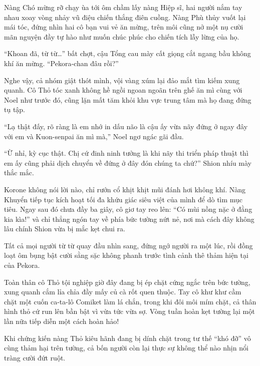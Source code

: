\documentclass[../main.tex]{subfiles}
\begin{document}

Nàng Chó mừng rỡ chạy ùa tới ôm chầm lấy nàng Hiệp sĩ, hai người nắm tay nhau xoay vòng nhảy vũ điệu chiến thắng điên cuồng. Nàng Phù thủy vuốt lại mái tóc, đứng nhìn hai cô bạn vui vẻ ăn mừng, trên môi cũng nở một nụ cười mãn nguyện đầy tự hào như muốn chúc phúc cho chiến tích lẫy lừng của họ.

``Khoan đã, từ từ\dots'' bất chợt, cậu Tổng cau mày cất giọng cắt ngang bầu không khí ăn mừng. ``Pekora-chan đâu rồi?''

Nghe vậy, cả nhóm giật thót mình, vội vàng xúm lại đảo mắt tìm kiếm xung quanh. Cô Thỏ tóc xanh không hề ngồi ngoan ngoãn trên ghế ăn mì cùng với Noel như trước đó, cũng lặn mất tăm khỏi khu vực trung tâm mà họ đang đứng tụ tập.

``Lạ thật đấy, rõ ràng là em nhớ in dấu não là cậu ấy vừa nãy đứng ở ngay đây với em và Kuon-senpai ăn mì mà,'' Noel ngơ ngác gãi đầu.

``Ừ nhỉ, kỳ cục thật. Chị cứ đinh ninh tưởng là khi nãy thi triển pháp thuật thì em ấy cũng phải dịch chuyển về đứng ở đây đón chúng ta chứ?'' Shion nhíu mày thắc mắc.

Korone không nói lời nào, chỉ rướn cổ khịt khịt mũi đánh hơi không khí. Nàng Khuyển tiếp tục kích hoạt tối đa khứu giác siêu việt của mình để dò tìm mục tiêu. Ngay sau đó chưa đầy ba giây, cô giơ tay reo lên: ``Có mùi nồng nặc ở đằng kia kìa!'' và chỉ thẳng ngón tay về phía bức tường nứt nẻ, nơi mà cách đây không lâu chính Shion vừa bị mắc kẹt chui ra.

Tất cả mọi người từ từ quay đầu nhìn sang, đứng ngớ người ra một lúc, rồi đồng loạt ôm bụng bật cười sằng sặc không phanh trước tình cảnh thê thảm hiện tại của Pekora.

Toàn thân cô Thỏ tội nghiệp giờ đây đang bị ép chặt cứng ngắc trên bức tường, xung quanh cắm lỉa chỉa đầy mấy củ cà rốt quen thuộc. Tay cô khư khư cầm chặt một cuốn ca-ta-lô Comiket làm lá chắn, trong khi đôi môi mím chặt, cả thân hình thỏ cứ run lên bần bật vì vừa tức vừa sợ. Vòng tuần hoàn kẹt tường lại một lần nữa tiếp diễn một cách hoàn hảo!


\omk

Khi chứng kiến nàng Thỏ kiêu hãnh đang bị dính chặt trong tư thế ``khó đỡ'' vô cùng thảm hại trên tường, cả bốn người còn lại thực sự không thể nào nhịn nổi tràng cười đứt ruột.
\end{document}
